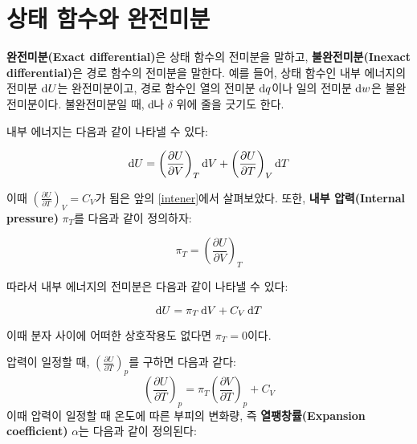     \section{상태 함수와 완전미분}\label{exactdiff}
        \hspace{\parindent} \textbf{완전미분(Exact differential)}은 상태 함수의 전미분을 말하고, \textbf{불완전미분(Inexact differential)}은 
        경로 함수의 전미분을 말한다. 예를 들어, 상태 함수인 내부 에너지의 전미분 $\operatorname{d\!} U$는 완전미분이고, 경로 함수인 열의 전미분 $\operatorname{d\!} q$이나 
        일의 전미분 $\operatorname{d\!} w$은 불완전미분이다. 불완전미분일 때, $\operatorname{d\!} $나 $\delta$ 위에 줄을 긋기도 한다.
        \par 내부 에너지는 다음과 같이 나타낼 수 있다:
        \begin{cor}
        \begin{equation*}
            \operatorname{d\!} U = \left(\frac{\partial U}{\partial V}\right)_T \operatorname{d\!} V + \left(\frac{\partial U}{\partial T}\right)_V \operatorname{d\!} T
        \end{equation*}
        \end{cor}
        이때 $\displaystyle\left(\frac{\partial U}{\partial T}\right)_V = C_V$가 됨은 앞의 \ref{intener}에서 살펴보았다. 또한, \textbf{내부 압력(Internal pressure)} $\pi_T$를 
        다음과 같이 정의하자:
        \begin{defn}[내부 압력]
        \begin{equation*}
            \pi_T = \left( \frac{\partial U}{\partial V}\right)_T
        \end{equation*}
        \end{defn}
        따라서 내부 에너지의 전미분은 다음과 같이 나타낼 수 있다:
        \begin{cor}
        \begin{equation*}
            \operatorname{d\!} U = \pi_T \operatorname{d\!} V + C_V \operatorname{d\!} T
        \end{equation*}
        \end{cor}
        이때 분자 사이에 어떠한 상호작용도 없다면 $\pi_T = 0$이다.
        \par 압력이 일정할 때, $\displaystyle\left( \frac{\partial U}{\partial T}\right)_p$를 구하면 다음과 같다:
        \begin{equation*}
            \left(\frac{\partial U}{\partial T}\right)_p = \pi_T\left(\frac{\partial V}{\partial T}\right)_p + C_V
        \end{equation*}
        이때 압력이 일정할 때 온도에 따른 부피의 변화량, 즉 \textbf{열팽창률(Expansion coefficient)} $\alpha$는 다음과 같이 정의된다:

